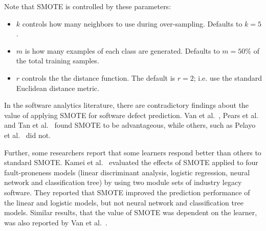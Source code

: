 \documentclass[10pt,conference]{IEEEtran}
\newcommand{\bi}{\begin{itemize}[leftmargin=0.4cm]}
\newcommand{\ei}{\end{itemize}}
\theoremstyle{break}
\theoremstyle{break}
\begin{document}
\noindent
Note that SMOTE is controlled by these  parameters:
\bi
\item $k$ controls how many neighbors to use during over-sampling. Defaults to $k=5$.
\item $m$ is how many examples of each class are generated. Defaults to $m=50\%$ of the total training samples.
\item $r$ controls the the distance function. The default is $r=2$;
i.e. use the  
standard Euclidean distance metric.
\ei

 


In the software analytics literature, there are contradictory findings about
the value of applying SMOTE for software defect prediction.
Van et al.~\cite{van2007experimental}, Pears et al.~\cite{pears2014synthetic} and Tan et al.~\cite{tan2015online} found SMOTE to be advantageous, while others, such as Pelayo et al.~\cite{pelayo2007applying} did not. 

Further, some researchers report that some learners respond better than others to standard SMOTE. Kamei et al.~\cite{kamei2007effects} evaluated the effects of SMOTE applied to  four fault-proneness models
(linear discriminant analysis, logistic regression, neural network and classification tree) by
using two module sets of industry legacy software. They reported that SMOTE improved the prediction performance of the linear and logistic models, but not neural network and classification tree models. Similar results, that the value of SMOTE was dependent on the learner,
was also reported by Van et al.~\cite{van2007experimental}.
\end{document}
